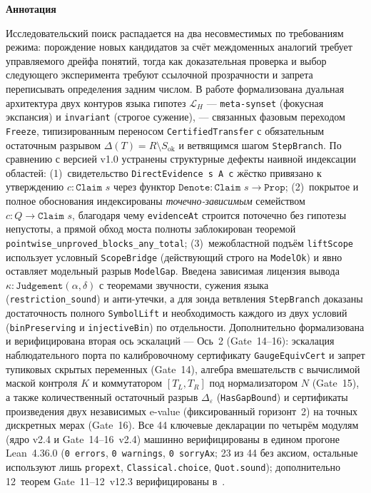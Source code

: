 \documentclass[11pt,a4paper]{article}
\theoremstyle{preprintthm}
\theoremstyle{preprintdef}
\newcommand{\LH}{\mathcal{L}_H}
\begin{document}
\begin{center}
\begin{minipage}{0.92\linewidth}
  \begin{center}\textbf{Аннотация}\end{center}
  \small
  Исследовательский поиск распадается на два несовместимых по требованиям режима: порождение новых кандидатов за счёт междоменных аналогий требует управляемого дрейфа понятий, тогда как доказательная проверка и выбор следующего эксперимента требуют ссылочной прозрачности и запрета переписывать определения задним числом. В работе формализована дуальная архитектура двух контуров языка гипотез $\LH$ --- \texttt{meta-synset} (фокусная экспансия) и \texttt{invariant} (строгое сужение), --- связанных фазовым переходом \texttt{Freeze}, типизированным переносом \texttt{CertifiedTransfer} с обязательным остаточным разрывом $\Delta(T)=R\setminus S_{\mathrm{ok}}$ и ветвящимся шагом \texttt{StepBranch}. По сравнению с версией v1.0 устранены структурные дефекты наивной индексации областей: (1)~свидетельство \texttt{DirectEvidence s A c} жёстко привязано к утверждению $c:\texttt{Claim } s$ через функтор $\texttt{Denote}:\texttt{Claim } s\to\texttt{Prop}$; (2)~покрытое и полное обоснования индексированы \emph{точечно-зависимым} семейством $c:Q\to\texttt{Claim } s$, благодаря чему \texttt{evidenceAt} строится поточечно без гипотезы непустоты, а прямой обход моста полноты заблокирован теоремой \texttt{pointwise\_\allowbreak unproved\_\allowbreak blocks\_\allowbreak any\_\allowbreak total}; (3)~межобластной подъём \texttt{liftScope} использует условный \texttt{ScopeBridge} (действующий строго на \texttt{ModelOk}) и явно оставляет модельный разрыв \texttt{ModelGap}. Введена зависимая лицензия вывода $\kappa:\texttt{Judgement}(\alpha,\delta)$ с теоремами звучности, сужения языка (\texttt{restriction\_\allowbreak sound}) и анти-утечки, а для зонда ветвления \texttt{StepBranch} доказаны достаточность полного \texttt{SymbolLift} и необходимость каждого из двух условий (\texttt{binPreserving} и \texttt{injectiveBin}) по отдельности. Дополнительно формализована и верифицирована вторая ось эскалаций --- Ось~2 (Gate~14--16): эскалация наблюдательного порта по калибровочному сертификату \texttt{GaugeEquivCert} и запрет тупиковых скрытых переменных (Gate~14), алгебра вмешательств с вычислимой маской контроля $K$ и коммутатором $[T_L,T_R]$ под нормализатором $N$ (Gate~15), а также количественный остаточный разрыв $\Delta_\varepsilon$ (\texttt{HasGapBound}) и сертификаты произведения двух независимых e-value (фиксированный горизонт~2) на точных дискретных мерах (Gate~16). Все 44 ключевые декларации по четырём модулям (ядро v2.4 и Gate~14--16~v2.4) машинно верифицированы в едином прогоне Lean~4.36.0 (\texttt{0~errors}, \texttt{0~warnings}, \texttt{0~sorryAx}; 23 из 44 без аксиом, остальные используют лишь \texttt{propext}, \texttt{Classical.choice}, \texttt{Quot.sound}); дополнительно 12~теорем Gate~11--12~v12.3 верифицированы в~\cite{strand2026hl}.
\end{minipage}
\end{center}
\end{document}
